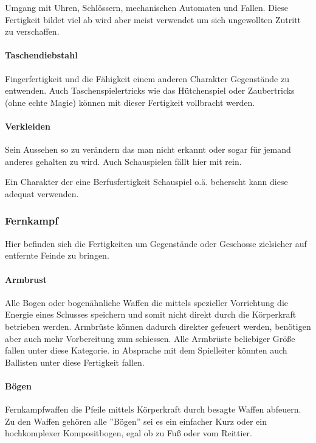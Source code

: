 \documentclass{article}
\begin{document}
Umgang mit Uhren, Schlössern, mechanischen Automaten und Fallen. Diese Fertigkeit bildet viel ab wird aber meist
verwendet um sich ungewollten Zutritt zu verschaffen.

\paragraph{Taschendiebstahl}

Fingerfertigkeit und die Fähigkeit einem anderen Charakter Gegenstände zu entwenden. Auch Taschenspielertricks wie
das Hütchenspiel oder Zaubertricks (ohne echte Magie) können mit dieser Fertigkeit vollbracht werden.

\paragraph{Verkleiden}

Sein Aussehen so zu verändern das man nicht erkannt oder sogar für jemand anderes gehalten zu wird. Auch
Schauspielen fällt hier mit rein.

Ein Charakter der eine Berfusfertigkeit Schauspiel o.ä. beherscht kann diese adequat verwenden.

\subsubsection{Fernkampf}

Hier befinden sich die Fertigkeiten um Gegenstände oder Geschosse zielsicher auf entfernte Feinde zu bringen.

\paragraph{Armbrust}

Alle Bogen oder bogenähnliche Waffen die mittels spezieller Vorrichtung die Energie eines Schusses speichern und
somit nicht direkt durch die Körperkraft betrieben werden. Armbrüste können dadurch direkter gefeuert werden,
benötigen aber auch mehr Vorbereitung zum schiessen. Alle Armbrüste beliebiger Größe fallen unter diese Kategorie.
in Absprache mit dem Spielleiter könnten auch Ballisten unter diese Fertigkeit fallen.

\paragraph{Bögen}

Fernkampfwaffen die Pfeile mittels Körperkraft durch besagte Waffen abfeuern. Zu den Waffen gehören alle ''Bögen'' sei
es ein einfacher Kurz oder ein hochkomplexer Kompositbogen, egal ob zu Fuß oder vom Reittier.
\end{document}
